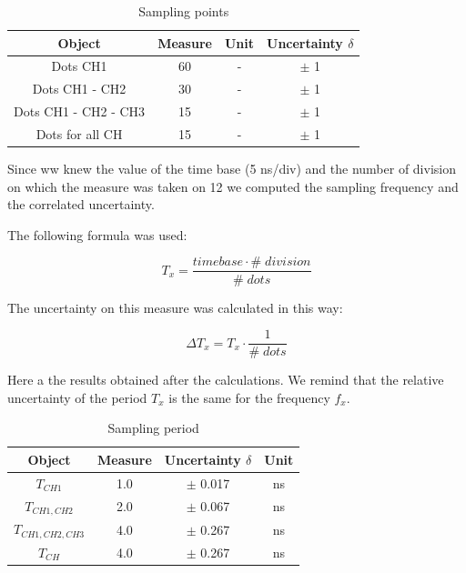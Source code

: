 \documentclass[../main.tex]{subfiles}
\begin{document}
\begin{table}[h!]
\centering	

\begin{tabular}{cccc}
\textbf{Object} & \textbf{Measure} & \textbf{Unit} & \textbf{Uncertainty $\delta$}  \\
\hline

Dots CH1 & 60 & - & $\pm$ 1 \\
\hline
Dots CH1 - CH2 & 30 & - & $\pm$ 1 \\
\hline
Dots CH1 - CH2 - CH3 & 15 & - & $\pm$ 1 \\
\hline
Dots for all CH & 15 & - & $\pm$ 1 \\


\end{tabular}
\caption*{Sampling points}
\end{table}

Since ww knew the value of the time base (5 ns/div) and the number of division on which the measure was taken on 12 we computed the sampling frequency and the correlated uncertainty.


The following formula was used:

\begin{equation}
	T_x = \frac{\unit{timebase} \cdot \unit{\#\;division}}{\unit{\#\;dots}}
\end{equation}

The uncertainty on this measure was calculated in this way:

\begin{equation}
	\Delta T_x = T_x \cdot \frac{1}{\unit{\#\;dots}}
\end{equation}

Here a the results obtained after the calculations. We remind that the relative uncertainty of the period $T_x$ is the same for the frequency $f_x$.

\begin{table}[h!]
\centering	

\begin{tabular}{cccc}
\textbf{Object} & \textbf{Measure} & \textbf{Uncertainty $\delta$} & \textbf{Unit}  \\
\hline

$T_{\unit{CH1}}$ & 1.0 & $\pm$ 0.017  & ns \\
\hline
$T_{\unit{CH1,CH2}}$ & 2.0 & $\pm$ 0.067  & ns \\
\hline
$T_{\unit{CH1,CH2,CH3}}$ & 4.0 & $\pm$ 0.267 & ns  \\
\hline
$T_{\unit{CH}}$ & 4.0  & $\pm$ 0.267 & ns  \\

\end{tabular}
\caption*{Sampling period}
\end{table}
\end{document}
